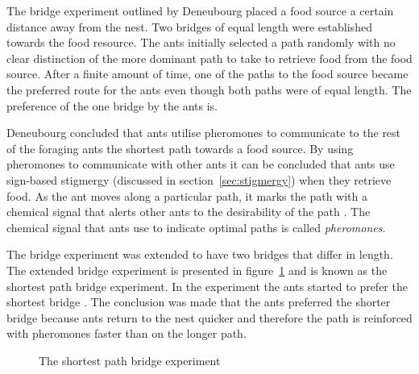 The bridge experiment outlined by Deneubourg placed a food source a certain distance away from the nest\cite{AntsAndStigmergy,CompuIntelligenceIntro}. Two bridges of equal length were established towards the food resource. The ants initially selected a path randomly with no clear distinction of the more dominant path to take to retrieve food from the food source\cite{AntsAndStigmergy,CompuIntelligenceIntro}. After a finite amount of time, one of the paths to the food source became the preferred route for the ants even though both paths were of equal length. The preference of the one bridge by the ants is.

Deneubourg concluded that ants utilise pheromones to communicate to the rest of the foraging ants the shortest path towards a food source.\cite{FundamentalSwarm} By using pheromones to communicate with other ants it can be concluded that ants use sign-based stigmergy (discussed in section~\ref{sec:stigmergy}) when they retrieve food\cite{AntIntroTrends,AntsAndStigmergy,CompuIntelligenceIntro}. As the ant moves along a particular path, it marks the path with a chemical signal that alerts other ants to the desirability of the path \cite{CompuIntelligenceIntro}. The chemical signal that ants use to indicate optimal paths is called \emph{pheromones}\cite{AntsAndStigmergy,CompuIntelligenceIntro}.

The bridge experiment was extended to have two bridges that differ in length. The extended bridge experiment is presented in figure~\ref{fig:antBridgeExperiment} and is known as the shortest path bridge experiment\cite{FundamentalSwarm}. In the experiment the ants started to prefer the shortest bridge \cite{FundamentalSwarm}. The conclusion was made that the ants preferred the shorter bridge because ants return to the nest quicker and therefore the path is reinforced with pheromones faster than on the longer path\cite{FundamentalSwarm}.

\begin{figure}[H]
	\centering
	\setlength \fboxsep{0pt}
	\setlength \fboxrule{0.5pt}
	\caption{The shortest path bridge experiment \cite{AntsAndStigmergy}}
	\label{fig:antBridgeExperiment}
\end{figure}

